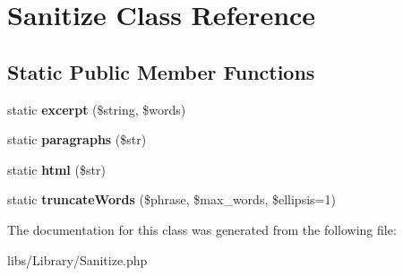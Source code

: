 \hypertarget{classSanitize}{
\section{Sanitize Class Reference}
\label{classSanitize}
}
\subsection*{Static Public Member Functions}
\begin{DoxyCompactItemize}
\item 
\hypertarget{classSanitize_a3f1f2431b4602a6881873ca42f047a4f}{
static {\bfseries excerpt} (\$string, \$words)}
\label{classSanitize_a3f1f2431b4602a6881873ca42f047a4f}

\item 
\hypertarget{classSanitize_a13659f258620d59d81105274d8835fcb}{
static {\bfseries paragraphs} (\$str)}
\label{classSanitize_a13659f258620d59d81105274d8835fcb}

\item 
\hypertarget{classSanitize_a047f2a14dea5335b577e06759eebbec0}{
static {\bfseries html} (\$str)}
\label{classSanitize_a047f2a14dea5335b577e06759eebbec0}

\item 
\hypertarget{classSanitize_a2f114a1a37387353d4a28378a6fcb685}{
static {\bfseries truncateWords} (\$phrase, \$max\_\-words, \$ellipsis=1)}
\label{classSanitize_a2f114a1a37387353d4a28378a6fcb685}

\end{DoxyCompactItemize}


The documentation for this class was generated from the following file:\begin{DoxyCompactItemize}
\item 
libs/Library/Sanitize.php\end{DoxyCompactItemize}
